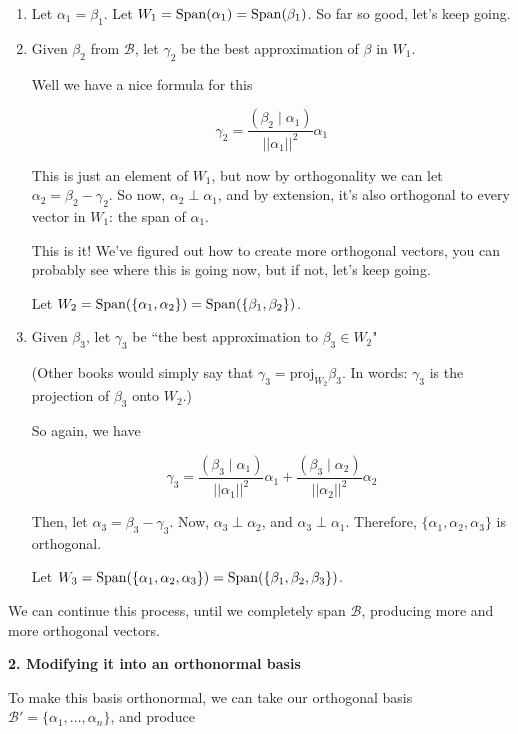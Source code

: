 \documentclass[12pt]{article}
\def\proj{\text{proj}}
\def\B{\mathcal B}
\newcommand{\ip}[2]{\left( #1 \mid #2 \right)}
\begin{document}
  \begin{enumerate}
    \item Let $\alpha_1 = \beta_1$. Let $W_1 = \mathrm{Span}(\alpha_1) =
      \mathrm{Span}(\beta_1)$. So far so good, let's keep going.

    \item Given $\beta_2$ from $\B$, let $\gamma_2$ be the best approximation of
      $\beta$ in $W_1$. 

      Well we have a nice formula for this

      \[
        \gamma_2 = \frac{\ip{\beta_2}{\alpha_1}}{||\alpha_1||^2} \alpha_1
      \]

      This is just an element of $W_1$, but now by orthogonality we can let
      $\alpha_2 = \beta_2 - \gamma_2$. So now, $\alpha_2 \perp \alpha_1$, and by
      extension, it's also orthogonal to every vector in $W_1$: the span of
      $\alpha_1$.

      This is it! We've figured out how to create more orthogonal vectors, you
      can probably see where this is going now, but if not, let's keep going.

      Let $W_2 = \mathrm{Span}(\{\alpha_1, \alpha_2\}) = \mathrm{Span}(\{\beta_1, \beta_2\})$.

    \item Given $\beta_3$, let $\gamma_3$ be ``the best approximation to
      $\beta_3 \in W_2$"

      (Other books would simply say that $\gamma_3 = \proj_{W_2} \beta_3$. In
      words: $\gamma_3$ is the projection of $\beta_3$ onto $W_2$.)
      
      So again, we have

      \[
        \gamma_3 = \frac{\ip{\beta_3}{\alpha_1}}{||\alpha_1||^2} \alpha_1 +
        \frac{\ip{\beta_3}{\alpha_2}}{||\alpha_2||^2} \alpha_2
      \]

      Then, let $\alpha_3 = \beta_3 - \gamma_3$. Now, $\alpha_3 \perp \alpha_2$,
      and $\alpha_3 \perp \alpha_1$. Therefore, $\{\alpha_1, \alpha_2,
      \alpha_3\}$ is orthogonal.

      Let $W_3 = \mathrm{Span}(\{\alpha_1, \alpha_2, \alpha_3\}) = \mathrm{Span}(\{\beta_1,
      \beta_2, \beta_3\})$.
  \end{enumerate}

  We can continue this process, until we completely span $\B$, producing more
  and more orthogonal vectors.

  {\bf 2. Modifying it into an orthonormal basis}

  To make this basis orthonormal, we can take our orthogonal basis $\B' =
  \{\alpha_1, \dots, \alpha_n\}$, and produce
\end{document}
